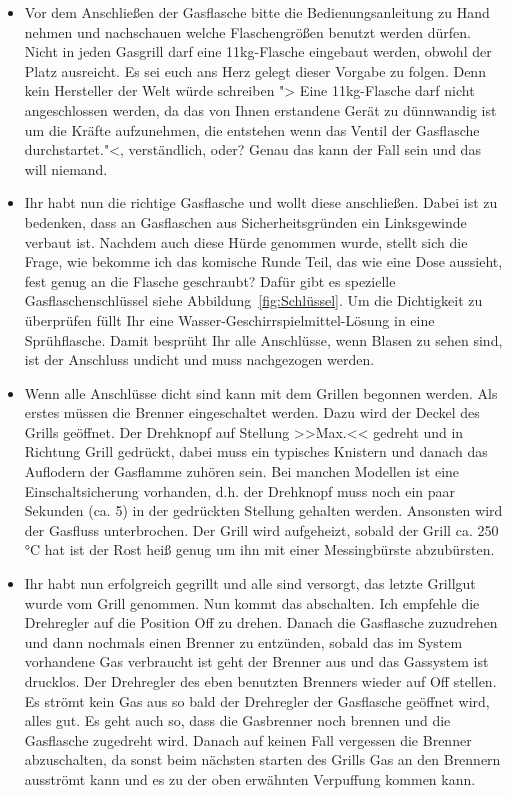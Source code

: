 	\begin{itemize}[noitemsep]
	\item Vor dem Anschließen der Gasflasche bitte die Bedienungsanleitung zu 
	Hand nehmen und nachschauen welche 
	Flaschengrößen benutzt 
	werden dürfen. Nicht in jeden Gasgrill darf eine 11kg-Flasche eingebaut 
	werden, obwohl der Platz ausreicht. Es sei 
	euch ans Herz gelegt dieser Vorgabe zu folgen. Denn kein Hersteller der 
	Welt würde schreiben "> Eine 11kg-Flasche darf 
	nicht 
	angeschlossen werden, da das von Ihnen erstandene Gerät zu dünnwandig 
	ist um die Kräfte aufzunehmen, die entstehen 
	wenn 
	das Ventil der Gasflasche durchstartet."<, verständlich, oder? Genau das kann
	der Fall sein und das will niemand.
	\item Ihr habt nun die richtige Gasflasche und wollt diese anschließen. 
	Dabei ist zu bedenken, dass an Gasflaschen aus 
	Sicherheitsgründen ein 
	Linksgewinde verbaut ist. Nachdem auch diese Hürde genommen wurde, 
	stellt sich die Frage, wie bekomme ich das 
	komische Runde Teil, 
	das wie eine Dose aussieht, fest genug an die Flasche geschraubt?  Dafür 
	gibt es spezielle Gasflaschenschlüssel siehe 	
	Abbildung~\vref{fig:Schlüssel}. Um die Dichtigkeit zu überprüfen füllt Ihr 
	eine Wasser-Geschirrspielmittel-Lösung in 
	eine Sprühflasche. 
	Damit besprüht Ihr alle Anschlüsse, wenn Blasen zu sehen sind, ist der 
	Anschluss undicht und muss nachgezogen werden.
	
	\item Wenn alle Anschlüsse dicht sind kann mit dem Grillen begonnen 
	werden. Als erstes müssen die Brenner 
	eingeschaltet werden. Dazu 
	wird der Deckel des Grills geöffnet. Der Drehknopf auf Stellung >>Max.<< 
	gedreht und in Richtung Grill gedrückt, dabei 
	muss ein typisches Knistern und danach das Auflodern der Gasflamme 
	zuhören sein. Bei manchen Modellen ist eine 
	Einschaltsicherung 
	vorhanden, d.h. der Drehknopf muss noch ein paar Sekunden (ca. 5) in der 
	gedrückten Stellung gehalten werden. 
	Ansonsten wird der Gasfluss unterbrochen. Der Grill wird aufgeheizt, sobald 
	der Grill ca. 250 °C hat ist der Rost heiß 
	genug um ihn mit einer 
	Messingbürste abzubürsten.
	\item Ihr habt nun erfolgreich gegrillt und alle sind versorgt, das letzte 
	Grillgut wurde vom Grill genommen. Nun kommt 
	das abschalten. Ich 
	empfehle die Drehregler auf die Position Off zu drehen. Danach die 
	Gasflasche zuzudrehen und dann nochmals einen 
	Brenner zu entzünden,
	sobald das im System vorhandene Gas verbraucht ist geht der Brenner aus 
	und das Gassystem ist drucklos. 
	Der Drehregler des eben benutzten Brenners wieder auf Off stellen. Es 
	strömt kein Gas aus so bald der Drehregler der 
	Gasflasche geöffnet wird, alles gut. 
	Es geht auch so, dass die Gasbrenner noch brennen und die Gasflasche 
	zugedreht wird. Danach auf keinen Fall vergessen 
	die Brenner abzuschalten, da sonst beim nächsten 
	starten des Grills Gas an den Brennern ausströmt kann und es zu der oben 
	erwähnten Verpuffung kommen kann.
\end{itemize}

